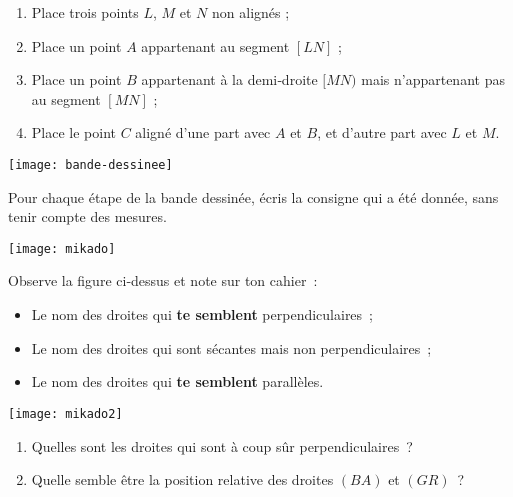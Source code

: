\begin{exercice}
\begin{enumerate} 
 \item Place trois points $L$, $M$ et $N$ non alignés ;
 \item Place un point $A$ appartenant au segment $[LN]$ ;
 \item Place un point $B$ appartenant à la demi‑droite $[MN)$ mais n'appartenant pas au segment $[MN]$ ;
 \item Place le point $C$ aligné d'une part avec $A$ et $B$, et d'autre part avec $L$ et $M$.
 \end{enumerate}
\end{exercice}


\begin{exercice}
 \begin{center} \texttt{[image: bande-dessinee]}  \end{center}
Pour chaque étape de la bande dessinée, écris la consigne qui a été donnée, sans tenir compte des mesures.
\end{exercice}



\begin{exercice}
 \begin{center} \texttt{[image: mikado]}  \end{center}
Observe la figure ci‑dessus et note sur ton cahier :
\begin{itemize}
 \item Le nom des droites qui \textbf{te semblent} perpendiculaires ;
 \item Le nom des droites qui sont sécantes mais non perpendiculaires ;
 \item Le nom des droites qui \textbf{te semblent} parallèles.
 \end{itemize}
\end{exercice}


\begin{exercice}
 \begin{center} \texttt{[image: mikado2]}  \end{center}
\begin{enumerate}
 \item Quelles sont les droites qui sont à coup sûr perpendiculaires ?
 \item Quelle semble être la position relative des droites $(BA)$ et $(GR)$ ?
 \end{enumerate}
\end{exercice}


